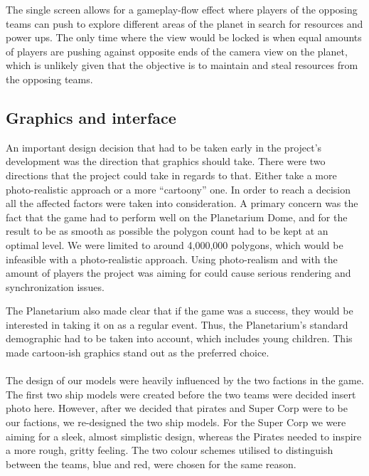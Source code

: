\documentclass[11pt,a4paper]{article}
\begin{document}
    The single screen allows for a gameplay-flow effect where players of the opposing teams can push to explore different areas of the planet in search for resources and power ups. The only time where the view would be locked is when equal amounts of players are pushing against opposite ends of the camera view on the planet, which is unlikely given that the objective is to maintain and steal resources from the opposing teams.

       \pagebreak
       \subsection{Graphics and interface}

        An important design decision that had to be taken early in the project's development was the direction that graphics should take. There were two directions that the project could take in regards to that. Either take a more photo-realistic approach or a more “cartoony” one. In order to reach a decision all the affected factors were taken into consideration. A primary concern was the fact that the game had to perform well on the Planetarium Dome, and for the result to be as smooth as possible the polygon count had to be kept at an optimal level. We were limited to around 4,000,000 polygons, which would be infeasible with a photo-realistic approach. Using photo-realism and with the amount of players the project was aiming for could cause serious rendering and synchronization issues.
        
        The Planetarium also made clear that if the game was a success, they would be interested in taking it on as a regular event. Thus, the Planetarium’s standard demographic had to be taken into account, which includes young children. This made cartoon-ish graphics stand out as the preferred choice.  \\ \\

        The design of our models were heavily influenced by the two factions in the game. The first two ship models were created before the two teams were decided {insert photo here}. However, after we decided that pirates and Super Corp were to be our factions, we re-designed the two ship models. For the Super Corp we were aiming for a sleek, almost simplistic design, whereas the Pirates needed to inspire a more rough, gritty feeling. The two colour schemes utilised to distinguish between the teams, blue and red, were chosen for the same reason. \\ \\
\end{document}
